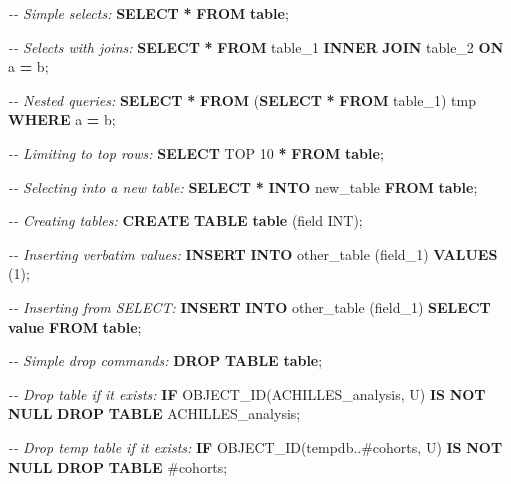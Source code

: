 \documentclass[
  11pt]{book}
\newenvironment{Shaded}{\begin{snugshade}}{\end{snugshade}}
\newcommand{\CommentTok}[1]{\textcolor[rgb]{0.56,0.35,0.01}{\textit{#1}}}
\newcommand{\ControlFlowTok}[1]{\textcolor[rgb]{0.13,0.29,0.53}{\textbf{#1}}}
\newcommand{\DataTypeTok}[1]{\textcolor[rgb]{0.13,0.29,0.53}{#1}}
\newcommand{\DecValTok}[1]{\textcolor[rgb]{0.00,0.00,0.81}{#1}}
\newcommand{\FunctionTok}[1]{\textcolor[rgb]{0.13,0.29,0.53}{\textbf{#1}}}
\newcommand{\KeywordTok}[1]{\textcolor[rgb]{0.13,0.29,0.53}{\textbf{#1}}}
\newcommand{\NormalTok}[1]{#1}
\newcommand{\OperatorTok}[1]{\textcolor[rgb]{0.81,0.36,0.00}{\textbf{#1}}}
\newcommand{\StringTok}[1]{\textcolor[rgb]{0.31,0.60,0.02}{#1}}
\theoremstyle{definition}
\theoremstyle{definition}
\theoremstyle{definition}
\theoremstyle{definition}
\theoremstyle{remark}
\begin{document}
\begin{Shaded}
\begin{Highlighting}[]
\CommentTok{{-}{-} Simple selects:}
\KeywordTok{SELECT} \OperatorTok{*} \KeywordTok{FROM} \KeywordTok{table}\NormalTok{;}

\CommentTok{{-}{-} Selects with joins:}
\KeywordTok{SELECT} \OperatorTok{*} \KeywordTok{FROM}\NormalTok{ table\_1 }\KeywordTok{INNER} \KeywordTok{JOIN}\NormalTok{ table\_2 }\KeywordTok{ON}\NormalTok{ a }\OperatorTok{=}\NormalTok{ b;}

\CommentTok{{-}{-} Nested queries:}
\KeywordTok{SELECT} \OperatorTok{*} \KeywordTok{FROM}\NormalTok{ (}\KeywordTok{SELECT} \OperatorTok{*} \KeywordTok{FROM}\NormalTok{ table\_1) tmp }\KeywordTok{WHERE}\NormalTok{ a }\OperatorTok{=}\NormalTok{ b;}

\CommentTok{{-}{-} Limiting to top rows:}
\KeywordTok{SELECT}\NormalTok{ TOP }\DecValTok{10} \OperatorTok{*} \KeywordTok{FROM} \KeywordTok{table}\NormalTok{;}

\CommentTok{{-}{-} Selecting into a new table:}
\KeywordTok{SELECT} \OperatorTok{*} \KeywordTok{INTO}\NormalTok{ new\_table }\KeywordTok{FROM} \KeywordTok{table}\NormalTok{;}

\CommentTok{{-}{-} Creating tables:}
\KeywordTok{CREATE} \KeywordTok{TABLE} \KeywordTok{table}\NormalTok{ (field }\DataTypeTok{INT}\NormalTok{);}

\CommentTok{{-}{-} Inserting verbatim values:}
\KeywordTok{INSERT} \KeywordTok{INTO}\NormalTok{ other\_table (field\_1) }\KeywordTok{VALUES}\NormalTok{ (}\DecValTok{1}\NormalTok{);}

\CommentTok{{-}{-} Inserting from SELECT:}
\KeywordTok{INSERT} \KeywordTok{INTO}\NormalTok{ other\_table (field\_1) }\KeywordTok{SELECT} \FunctionTok{value} \KeywordTok{FROM} \KeywordTok{table}\NormalTok{;}

\CommentTok{{-}{-} Simple drop commands:}
\KeywordTok{DROP} \KeywordTok{TABLE} \KeywordTok{table}\NormalTok{;}

\CommentTok{{-}{-} Drop table if it exists:}
\ControlFlowTok{IF}\NormalTok{ OBJECT\_ID(}\StringTok{\textquotesingle{}ACHILLES\_analysis\textquotesingle{}}\NormalTok{, }\StringTok{\textquotesingle{}U\textquotesingle{}}\NormalTok{) }\KeywordTok{IS} \KeywordTok{NOT} \KeywordTok{NULL}
  \KeywordTok{DROP} \KeywordTok{TABLE}\NormalTok{ ACHILLES\_analysis;}

\CommentTok{{-}{-} Drop temp table if it exists:}
\ControlFlowTok{IF}\NormalTok{ OBJECT\_ID(}\StringTok{\textquotesingle{}tempdb..\#cohorts\textquotesingle{}}\NormalTok{, }\StringTok{\textquotesingle{}U\textquotesingle{}}\NormalTok{) }\KeywordTok{IS} \KeywordTok{NOT} \KeywordTok{NULL}
  \KeywordTok{DROP} \KeywordTok{TABLE}\NormalTok{ \#cohorts;}


\end{Highlighting}
\end{Shaded}
\end{document}
